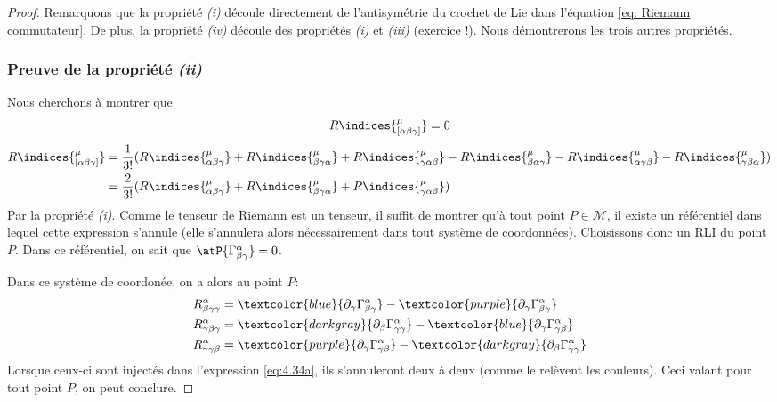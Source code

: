 \begin{proof}
    Remarquons que la propriété \emph{(i)} découle directement de l'antisymétrie du crochet de Lie dans l'équation \ref{eq: Riemann commutateur}. De plus, la propriété \emph{(iv)} découle des propriétés \emph{(i)} et \emph{(iii)} (exercice !). Nous démontrerons les trois autres propriétés.
    \subsubsection{Preuve de la propriété \emph{(ii)}}
        Nous cherchons à montrer que 
        \begin{equation*}
            R\indices{^{\mu}_{[\alpha \beta \gamma]}} = 0
        \end{equation*}
        \begin{align}
            R\indices{^{\mu}_{[\alpha \beta \gamma]}} &= \frac{1}{3!}(R\indices{^{\mu}_{\alpha \beta \gamma}} + R\indices{^{\mu}_{\beta \gamma \alpha }} + R\indices{^{\mu}_{\gamma \alpha \beta}} - R\indices{^{\mu}_{\beta \alpha \gamma }} - R\indices{^{\mu}_{\alpha \gamma \beta} }- R\indices{^{\mu}_{ \gamma \beta \alpha}})\\
            \label{eq:4.34a}
            &= \frac{2}{3!}(R\indices{^{\mu}_{\alpha \beta \gamma}} + R\indices{^{\mu}_{\beta \gamma \alpha}} + R\indices{^{\mu}_{\gamma \alpha \beta}})
        \end{align}
        Par la propriété \emph{(i)}. Comme le tenseur de Riemann est un tenseur, il suffit de montrer qu'à tout point $P\in \mathcal{M}$, il existe un référentiel dans lequel cette expression s'annule (elle s'annulera alors nécessairement dans tout système de coordonnées). Choisissons donc un RLI du point $P$. Dans ce référentiel, on sait que $\atP{\Gamma^{\alpha}_{\beta \gamma}} =0$.

        Dans ce système de coordonée, on a alors au point $P$:
        \begin{align}
            &R^{\alpha}_{\beta \gamma \gamma}= \textcolor{blue}{\partial_{\gamma}\Gamma^{\alpha}_{\beta \gamma}} - \textcolor{purple}{\partial_{\gamma}\Gamma^{\alpha}_{\beta \gamma}}\\
            &R^{\alpha}_{\gamma \beta \gamma}= \textcolor{darkgray}{\partial_{\beta}\Gamma^{\alpha}_{\gamma \gamma }} - \textcolor{blue}{\partial_{\gamma}\Gamma^{\alpha}_{\gamma \beta}}\\
            &R^{\alpha}_{\gamma \gamma \beta} =\textcolor{purple}{\partial_{\gamma}\Gamma^{\alpha}_{\gamma \beta}} - \textcolor{darkgray}{\partial_{\beta}\Gamma^{\alpha}_{ \gamma \gamma}}
        \end{align}
        Lorsque ceux-ci sont injectés dans l'expression \ref{eq:4.34a}, ils s'annuleront deux à deux (comme le relèvent les couleurs). Ceci valant pour tout point $P$, on peut conclure.

\end{proof}
